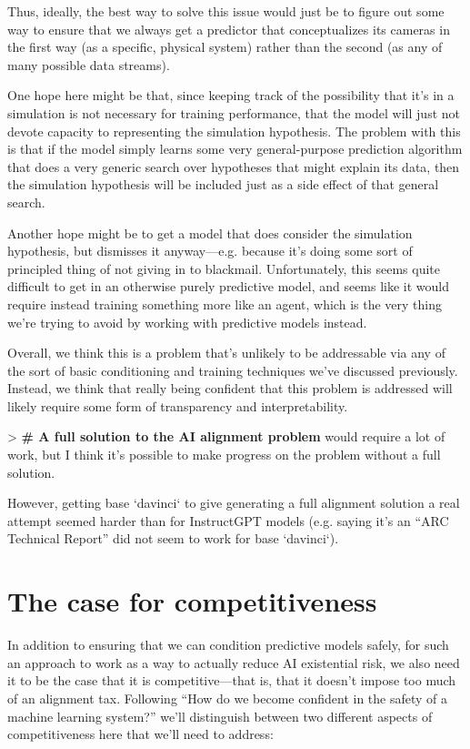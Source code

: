 {Thus, ideally, the best way to solve this issue would just be to figure out some way to ensure that we always get a predictor that conceptualizes its cameras in the first way (as a specific, physical system) rather than the second (as any of many possible data streams).

One hope here might be that, since keeping track of the possibility that it's in a simulation is not necessary for training performance, that the model will just not devote capacity to representing the simulation hypothesis. The problem with this is that if the model simply learns some very general-purpose prediction algorithm that does a very generic search over hypotheses that might explain its data, then the simulation hypothesis will be included just as a side effect of that general search.

Another hope might be to get a model that does consider the simulation hypothesis, but dismisses it anyway---e.g. because it's doing some sort of principled thing of not giving in to blackmail. Unfortunately, this seems quite difficult to get in an otherwise purely predictive model, and seems like it would require instead training something more like an agent, which is the very thing we're trying to avoid by working with predictive models instead.

Overall, we think this is a problem that's unlikely to be addressable via any of the sort of basic conditioning and training techniques we've discussed previously. Instead, we think that really being confident that this problem is addressed will likely require some form of transparency and interpretability.


     > \textbf{# A full solution to the AI alignment problem} would require a lot of work, but I think it's possible to make progress on the problem without a full solution.

     However, getting base `davinci` to give generating a full alignment solution a real attempt seemed harder than for InstructGPT models (e.g. saying it's an ``ARC Technical Report'' did not seem to work for base `davinci`).




\section{The case for competitiveness}
\label{sec:3}

In addition to ensuring that we can condition predictive models safely, for such an approach to work as a way to actually reduce AI existential risk, we also need it to be the case that it is competitive---that is, that it doesn't impose too much of an alignment tax\cite{TODO: cite https://forum.effectivealtruism.org/posts/63stBTw3WAW6k45dY/paul-christiano-current-work-in-ai-alignment}. Following ``How do we become confident in the safety of a machine learning system?\cite{TODO: cite https://www.alignmentforum.org/posts/FDJnZt8Ks2djouQTZ/how-do-we-become-confident-in-the-safety-of-a-machine}'' we'll distinguish between two different aspects of competitiveness here that we'll need to address:

}
